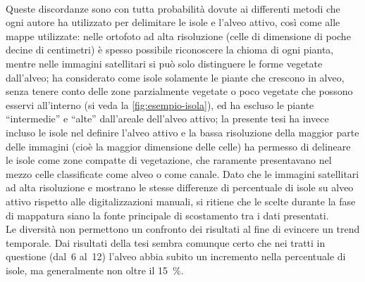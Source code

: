 \\
Queste discordanze sono con tutta probabilità dovute ai differenti metodi che ogni autore ha utilizzato per delimitare le isole e l'alveo attivo, così come alle mappe utilizzate:
nelle ortofoto ad alta risoluzione (celle di dimensione di poche decine di centimetri) è spesso possibile riconoscere la chioma di ogni pianta, mentre nelle immagini satellitari si può solo distinguere le forme vegetate dall'alveo;
 ha considerato come isole solamente le piante che crescono in alveo, senza tenere conto delle zone parzialmente vegetate o poco vegetate che possono esservi all'interno (si veda la \cref{fig:esempio-isola}), ed ha escluso le piante “intermedie” e “alte” dall'areale dell'alveo attivo;
la presente tesi ha invece incluso le isole nel definire l'alveo attivo e la bassa risoluzione della maggior parte delle immagini (cioè la maggior dimensione delle celle) ha permesso di delineare le isole come zone compatte di vegetazione, che raramente presentavano nel mezzo celle classificate come alveo o come canale.
Dato che le immagini satellitari ad alta risoluzione \Pl{} e \WV{} mostrano le stesse differenze di percentuale di isole su alveo attivo rispetto alle digitalizzazioni manuali, si ritiene che le scelte durante la fase di mappatura siano la fonte principale di scostamento tra i dati presentati.
\\
Le diversità non permettono un confronto dei risultati al fine di evincere un trend temporale.
Dai risultati della tesi sembra comunque certo che nei tratti in questione (dal~6 al~12) l'alveo abbia subito un incremento nella percentuale di isole, ma generalmente non oltre il \SI{15}{\percent}.

